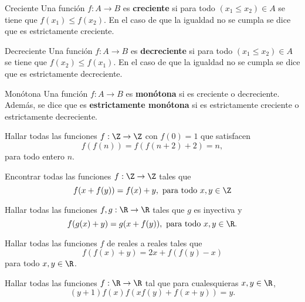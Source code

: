 \begin{definition.box}{Creciente}{}
    Una función $f : A \to B$ es \textbf{creciente} si para todo $(x_1 \leq x_2) \in A$ se tiene que $f(x_1) \leq f(x_2)$.
    En el caso de que la igualdad no se cumpla se dice que es estrictamente creciente.
\end{definition.box}

\begin{definition.box}{Decreciente}{}
    Una función $f : A \to B$ es \textbf{decreciente} si para todo $(x_1 \leq x_2) \in A$ se tiene que $f(x_2) \leq f(x_1)$.
    En el caso de que la igualdad no se cumpla se dice que es estrictamente decreciente.
\end{definition.box}

\begin{definition.box}{Monótona}{}
    Una función $f : A \to B$ es \textbf{monótona} si es creciente o decreciente.
    Además, se dice que es \textbf{estrictamente monótona} si es estrictamente creciente o estrictamente decreciente.
\end{definition.box}

\begin{exercise}
    Hallar todas las funciones $f : \Z \to \Z$ con $f(0) = 1$ que satisfacen
    \[
        f(f(n)) = f(f(n + 2) + 2) = n,
    \]
    para todo entero $n$.
\end{exercise}

\begin{exercise}
    Encontrar todas las funciones $f : \Z \to \Z$ tales que
    \[
        f(x + f(y)) = f(x) + y,\ \text{para todo}\ x,y \in \Z
    \]
\end{exercise}

\begin{exercise}
    Hallar todas las funciones $f,g : \R \to \R$ tales que $g$ es inyectiva y
    \[
        f(g(x) + y) = g(x + f(y)),\ \text{para todo}\ x,y \in \R.
    \]
\end{exercise}

\begin{exercise}
    Hallar todas las funciones $f$ de reales a reales tales que
    \[
        f(f(x) + y) = 2x + f(f(y) - x)
    \]
    para todo $x,y \in \R$.
\end{exercise}

\begin{exercise}
    Hallar todas las funciones $f : \R \to \R$ tal que para cualesquieras $x,y \in \R$,
    \[
        (y + 1)f(x)  f(x f(y) + f(x + y)) = y.
    \]
\end{exercise}

